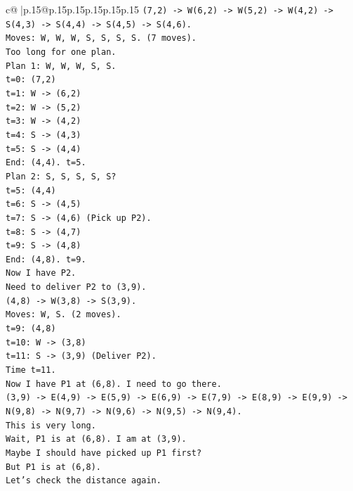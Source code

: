 \documentclass{article}
\begin{document}
{\begin{supertabular}{c@{$\;$}|p{.15\linewidth}@{}p{.15\linewidth}p{.15\linewidth}p{.15\linewidth}p{.15\linewidth}p{.15\linewidth}}
{{{\texttt{(7,2) {-}> W(6,2) {-}> W(5,2) {-}> W(4,2) {-}> S(4,3) {-}> S(4,4) {-}> S(4,5) {-}> S(4,6).} \\
\texttt{Moves: W, W, W, S, S, S, S. (7 moves).} \\
\texttt{Too long for one plan.} \\
\texttt{Plan 1: W, W, W, S, S.} \\
\texttt{t=0: (7,2)} \\
\texttt{t=1: W {-}> (6,2)} \\
\texttt{t=2: W {-}> (5,2)} \\
\texttt{t=3: W {-}> (4,2)} \\
\texttt{t=4: S {-}> (4,3)} \\
\texttt{t=5: S {-}> (4,4)} \\
\texttt{End: (4,4). t=5.} \\
\texttt{Plan 2: S, S, S, S, S?} \\
\texttt{t=5: (4,4)} \\
\texttt{t=6: S {-}> (4,5)} \\
\texttt{t=7: S {-}> (4,6) (Pick up P2).} \\
\texttt{t=8: S {-}> (4,7)} \\
\texttt{t=9: S {-}> (4,8)} \\
\texttt{End: (4,8). t=9.} \\
\texttt{Now I have P2.} \\
\texttt{Need to deliver P2 to (3,9).} \\
\texttt{(4,8) {-}> W(3,8) {-}> S(3,9).} \\
\texttt{Moves: W, S. (2 moves).} \\
\texttt{t=9: (4,8)} \\
\texttt{t=10: W {-}> (3,8)} \\
\texttt{t=11: S {-}> (3,9) (Deliver P2).} \\
\texttt{Time t=11.} \\
\texttt{Now I have P1 at (6,8). I need to go there.} \\
\texttt{(3,9) {-}> E(4,9) {-}> E(5,9) {-}> E(6,9) {-}> E(7,9) {-}> E(8,9) {-}> E(9,9) {-}> N(9,8) {-}> N(9,7) {-}> N(9,6) {-}> N(9,5) {-}> N(9,4).} \\
\texttt{This is very long.} \\
\texttt{Wait, P1 is at (6,8). I am at (3,9).} \\
\texttt{Maybe I should have picked up P1 first?} \\
\texttt{But P1 is at (6,8).} \\
\texttt{Let's check the distance again.} \\
}}}
\end{supertabular}}
\end{document}
